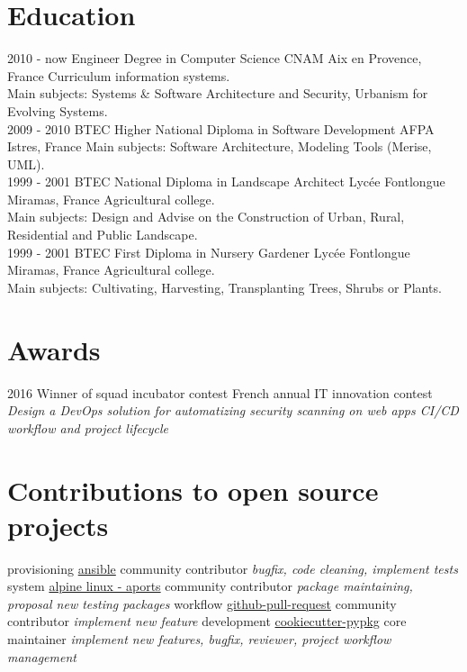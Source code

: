 \documentclass[]{friggeri-cv}
\begin{document}
\section{Education}
\begin{entrylist}
    \entry
        {2010 - now}
        {Engineer Degree in Computer Science}
        {CNAM Aix en Provence, France}
        {Curriculum information systems.\\
        Main subjects: Systems \& Software Architecture and Security, Urbanism for Evolving Systems.\\}
    \entry
        {2009 - 2010}
        {BTEC Higher National Diploma in Software Development}
        {AFPA Istres, France}
        {Main subjects: Software Architecture, Modeling Tools (Merise, UML).\\}
    \entry
        {1999 - 2001}
        {BTEC National Diploma in Landscape Architect}
        {Lycée Fontlongue Miramas, France}
        {Agricultural college.\\
        Main subjects: Design and Advise on the Construction of Urban, Rural, Residential and Public Landscape.\\}
    \entry
        {1999 - 2001}
        {BTEC First Diploma in Nursery Gardener}
        {Lycée Fontlongue Miramas, France}
        {Agricultural college.\\
        Main subjects: Cultivating, Harvesting, Transplanting Trees, Shrubs or Plants.}
\end{entrylist}

\section{Awards}
\begin{entrylist}
  \entry
    {2016}
    {Winner of squad incubator contest}
    {French annual IT innovation contest}
    {\emph{Design a DevOps solution for automatizing security scanning on web apps CI/CD workflow and project lifecycle}}
\end{entrylist}

\section{Contributions to open source projects}
\begin{entrylist}
  \entry
    {provisioning}
    {\href{https://github.com/ansible/ansible}{ansible}}
    {community contributor}
    {\emph{bugfix, code cleaning, implement tests}}
  \entry
    {system}
    {\href{https://github.com/alpinelinux/aports}{alpine linux - aports}}
    {community contributor}
    {\emph{package maintaining, proposal new testing packages}}
  \entry
    {workflow}
    {\href{https://github.com/jd/git-pull-request}{github-pull-request}}
    {community contributor}
    {\emph{implement new feature}}
  \entry
    {development}
    {\href{https://github.com/AntoineCezar/cookiecutter-pypkg}{cookiecutter-pypkg}}
    {core maintainer}
    {\emph{implement new features, bugfix, reviewer, project workflow management}}
\end{entrylist}
\end{document}
